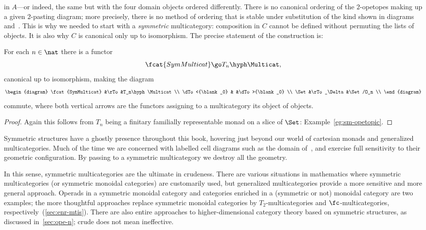 %
%
%
in $A$---or indeed, the same but with the four domain objects ordered%
%
%
%
%
differently.  There is no canonical ordering of the $2$-opetopes making up
a given $2$-pasting diagram; more precisely, there is no method of ordering
that is stable under substitution of the kind shown in
diagrams~ and~.  This is why we
needed to start with a \emph{symmetric} multicategory: composition in $C$
cannot be defined without permuting the lists of objects.  It is also why
$C$ is canonical only up to isomorphism.  The precise statement of the
construction is:
%
\begin{thm}	
For each $n\in\nat$ there is a functor 
\[
\fcat{SymMulticat} \go T_n\hyph\Multicat,
\]
canonical up to isomorphism, making the diagram
\[
\begin{diagram}
\fcat{SymMulticat}	&\rTo		&T_n\hyph\Multicat	\\
\dTo<{\blank_0}		&		&\dTo>{\blank_0}	\\
\Set			&\rTo_\Delta	&\Set/O_n		\\
\end{diagram}
\]
commute, where both vertical arrows are the functors assigning to a
multicategory its object of objects.
\end{thm}
%
\begin{proof}
Again this follows from $T_n$ being a finitary familially representable
monad on a slice of $\Set$: Example~\ref{eg:sm-opetopic}.
\done
\end{proof}

Symmetric%
%
% 
structures have a ghostly presence throughout this book, hovering just
beyond our world of cartesian monads and generalized multicategories.  Much
of the time we are concerned with labelled cell diagrams such as the domain
of~, and exercise full sensitivity to their geometric
configuration.  By passing to a symmetric multicategory we destroy all the
geometry.

In this sense, symmetric multicategories are the ultimate in crudeness.
There are various situations in mathematics where symmetric multicategories
(or symmetric monoidal categories) are customarily used, but generalized
multicategories provide a more sensitive and more general approach.
Operads in a symmetric monoidal category and categories enriched in a
(symmetric or not) monoidal category are two examples; the more thoughtful
approaches replace symmetric monoidal categories by $T_2$-multicategories
and $\fc$-multicategories, respectively~(\ref{sec:enr-mtis}).  There are
also entire approaches to higher-dimensional category theory based on
symmetric structures, as discussed in~\ref{sec:ope-n}; crude does not mean
ineffective.%
%
%




